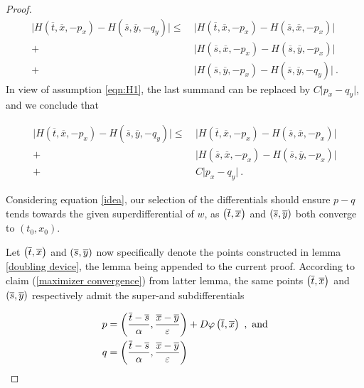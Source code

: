 \begin{theorem}
\begin{proof}
		  		\begin{equation*}
		  		\begin{split}
		  		\lvert H(\overline{t}, \overline{x}, -p_x) - H(\overline{s}, \overline{y}, -q_y) \rvert \leq \
		  		&\lvert H(\overline{t}, \overline{x}, -p_x) - H(\overline{s}, \overline{x}, -p_x) \rvert \\
		  		+&\lvert H(\overline{s}, \overline{x}, -p_x) - H(\overline{s}, \overline{y}, -p_x) \rvert \\
		  		+&\lvert H(\overline{s}, \overline{y}, -p_x) - H(\overline{s}, \overline{y}, -q_y) \rvert \ .
		  		\end{split} 
		  		\end{equation*}
		  		In view of assumption \eqref{eqn:H1}, the last summand can be replaced by $ C \lvert p_x - q_y \rvert $, and we conclude that
		  		
		  		\begin{equation}
		  		\label{idea}
		  		\begin{split}
		  		\lvert H(\overline{t}, \overline{x}, -p_x) - H(\overline{s}, \overline{y}, -q_y) \rvert \leq \
		  		&\lvert H(\overline{t}, \overline{x}, -p_x) - H(\overline{s}, \overline{x}, -p_x) \rvert \\
		  		+&\lvert H(\overline{s}, \overline{x}, -p_x) - H(\overline{s}, \overline{y}, -p_x) \rvert \\
		  		+& C \lvert p_x - q_y \rvert \ .
		  		\end{split}
		  		\end{equation}
		  		
		  		Considering equation \eqref{idea}, our selection of the differentials should ensure $ p - q $ tends towards the given superdifferential of $ w $, as $ \left(\overline{t}, \overline{x}\right) $ and $ \left(\overline{s}, \overline{y}\right) $ both converge to $ (t_0, x_0) $.
		  		
		  		Let $ \left(\overline{t}, \overline{x}\right) $ and $ \left(\overline{s}, \overline{y}\right) $ now specifically denote the points constructed in lemma \ref{doubling device}, the lemma being appended to the current proof. According to claim (\ref{maximizer convergence}) from latter lemma, the same points $ \left(\overline{t}, \overline{x}\right) $ and $ \left(\overline{s}, \overline{y}\right) $ respectively admit the super-and subdifferentials
		  		
		  		\begin{align*}
		  				p &= \left( \frac{\overline{t} - \overline{s}}{\alpha}, \frac{\overline{x} - \overline{y}}{\varepsilon} \right) + D\varphi\left(\overline{t}, \overline{x}\right) \ , \text{ and} \\
		  			q &= \left( \frac{\overline{t} - \overline{s}}{\alpha}, \frac{\overline{x} - \overline{y}}{\varepsilon} \right)
		  		\end{align*}
		  		

\end{proof}
\end{theorem}
